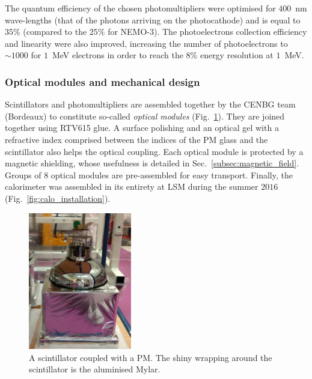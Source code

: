 The quantum efficiency of the chosen photomultipliers were optimised for $400$~nm wave-lengths (that of the photons arriving on the photocathode) and is equal to $35$\% (compared to the $25$\% for NEMO-$3$).
The photoelectrons collection efficiency and linearity were also improved, increasing the number of photoelectrons to $\sim1000$ for $1$~MeV electrons in order to reach the $8$\% energy resolution at $1$~MeV.


\subsubsection*{Optical modules and mechanical design}

Scintillators and photomultipliers are assembled together by the CENBG team (Bordeaux) to constitute so-called \emph{optical modules} (Fig.~\ref{fig:scintillator_PMT}).
They are joined together using RTV615 glue.
A surface polishing and an optical gel with a refractive index comprised between the indices of the PM glass and the scintillator also helps the optical coupling.
Each optical module is protected by a magnetic shielding, whose usefulness is detailed in Sec.~\ref{subsec:magnetic_field}.
Groups of $8$ optical modules are pre-assembled for easy transport.
Finally, the calorimeter was assembled in its entirety at LSM during the summer $2016$ (Fig.~\ref{fig:calo_installation}).
\begin{figure}[h!]
\centering
\includegraphics[width=0.4\textwidth]{SNdemonstrator/fig_SNdemonstrator/scintillator_wrap.pdf}
\caption{A scintillator coupled with a PM.
  The shiny wrapping around the scintillator is the aluminised Mylar.
\label{fig:scintillator_PMT}}
\end{figure}
